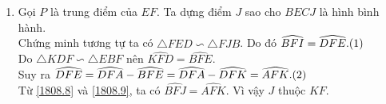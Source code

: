 \begin{ex}
{\begin{enumerate}
				\\ Do đó $\triangle FCB \backsim \triangle FAD$ (g-g). Suy ra $\dfrac{CB}{AD} =\dfrac{BF}{DF}. \refstepcounter{equation}\hfill (\theequation)\label{1808.4}$
				\\ Do $ABCD$ là tứ giác nội tiếp nên $\widehat{ADB} =\widehat{ACB}$ và $\widehat{DAC} =\widehat{DBC}$ (góc nội tiếp chắn cùng một cung).
				\\ Xét $\triangle ADE$ và $\triangle BCE$ có $\widehat{ADE} =\widehat{BCE}$ và $\widehat{DAE} = \widehat{CBE}$. 
				\\ Do đó $\triangle ADE \backsim BCD$ (g-g). Suy ra $\dfrac{CB}{AD} =\dfrac{EB}{EA}. \refstepcounter{equation}\hfill (\theequation)\label{1808.5}$
				\\ Từ \eqref{1808.4} và \eqref{1808.5}, ta có $\dfrac{BF}{DF} =\dfrac{EB}{EA}$. 
				\\ Mặt khác $EA =KD$ (do $AEDK$ là hình bình hành), ta có $\dfrac{BF}{DF} =\dfrac{EB}{DK}. \refstepcounter{equation}\hfill (\theequation)\label{1808.6}$
				\\ Ta có $\widehat{KDE} =\widehat{KAE}$ (do $AEDK$ là hình bình hành) và $\widehat{CAB} =\widehat{CDB} $ (do $ABCD$ nội tiếp).
				\\ Do đó $\widehat{KDF} =\widehat{KDE} +\widehat{EDC} =\widehat{KAE} +\widehat{CAB} = \widehat{KAF}$.
				\\ Mặt khác, do $AK \parallel DB$ nên $\widehat{KAF} =\widehat{EBF}$ (góc ở vị trí đồng vị).
				\\ Suy ra $\widehat{KDF} =\widehat{EBF} \refstepcounter{equation}\hfill (\theequation)\label{1808.7}$
				\\ Từ \eqref{1808.6} và \eqref{1808.7}, ta suy ra $\triangle KDF \backsim \triangle EBF$ (c-g-c).
				\item Gọi $P$ là trung điểm của $EF$. Ta dựng điểm $J$ sao cho $BECJ$ là hình bình hành.
				\\ Chứng minh tương tự ta có $\triangle FED \backsim \triangle FJB$. Do đó $\widehat{BFI} =\widehat{DFE}. \refstepcounter{equation}\hfill (\theequation)\label{1808.8}$
				\\ Do $\triangle KDF \backsim \triangle EBF$ nên $\widehat{KFD} =\widehat{BFE}$. 
				\\ Suy ra $\widehat{DFE} =\widehat{DFA} -\widehat{BFE} =\widehat{DFA} -\widehat{DFK} =\widehat{AFK}. \refstepcounter{equation}\hfill (\theequation)\label{1808.9}$
				\\ Từ \eqref{1808.8} và \eqref{1808.9}, ta có $\widehat{BFJ} =\widehat{AFK}$. Vì vậy $J$ thuộc $KF$.

\end{enumerate}}
\end{ex}
